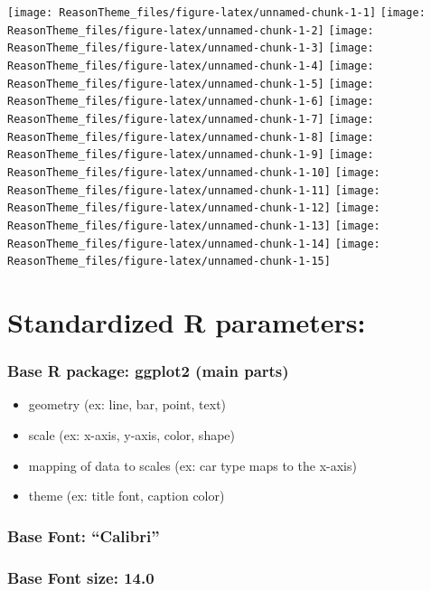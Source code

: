 \documentclass[
]{article}
\providecommand{\tightlist}{%
  \setlength{\itemsep}{0pt}\setlength{\parskip}{0pt}}
\begin{document}
\texttt{[image: ReasonTheme\_files/figure-latex/unnamed-chunk-1-1]}
\texttt{[image: ReasonTheme\_files/figure-latex/unnamed-chunk-1-2]}
\texttt{[image: ReasonTheme\_files/figure-latex/unnamed-chunk-1-3]}
\texttt{[image: ReasonTheme\_files/figure-latex/unnamed-chunk-1-4]}
\texttt{[image: ReasonTheme\_files/figure-latex/unnamed-chunk-1-5]}
\texttt{[image: ReasonTheme\_files/figure-latex/unnamed-chunk-1-6]}
\texttt{[image: ReasonTheme\_files/figure-latex/unnamed-chunk-1-7]}
\texttt{[image: ReasonTheme\_files/figure-latex/unnamed-chunk-1-8]}
\texttt{[image: ReasonTheme\_files/figure-latex/unnamed-chunk-1-9]}
\texttt{[image: ReasonTheme\_files/figure-latex/unnamed-chunk-1-10]}
\texttt{[image: ReasonTheme\_files/figure-latex/unnamed-chunk-1-11]}
\texttt{[image: ReasonTheme\_files/figure-latex/unnamed-chunk-1-12]}
\texttt{[image: ReasonTheme\_files/figure-latex/unnamed-chunk-1-13]}
\texttt{[image: ReasonTheme\_files/figure-latex/unnamed-chunk-1-14]}
\texttt{[image: ReasonTheme\_files/figure-latex/unnamed-chunk-1-15]}

\hypertarget{standardized-r-parameters}{%
\section{Standardized R parameters:}\label{standardized-r-parameters}}

\hypertarget{base-r-package-ggplot2-main-parts}{%
\subsubsection{Base R package: ggplot2 (main
parts)}\label{base-r-package-ggplot2-main-parts}}

\begin{itemize}
\tightlist
\item
  geometry (ex: line, bar, point, text)
\item
  scale (ex: x-axis, y-axis, color, shape)
\item
  mapping of data to scales (ex: car type maps to the x-axis)
\item
  theme (ex: title font, caption color)
\end{itemize}

\hypertarget{base-font-calibri}{%
\subsubsection{Base Font: ``Calibri''}\label{base-font-calibri}}

\hypertarget{base-font-size-14.0}{%
\subsubsection{Base Font size: 14.0}\label{base-font-size-14.0}}
\end{document}
